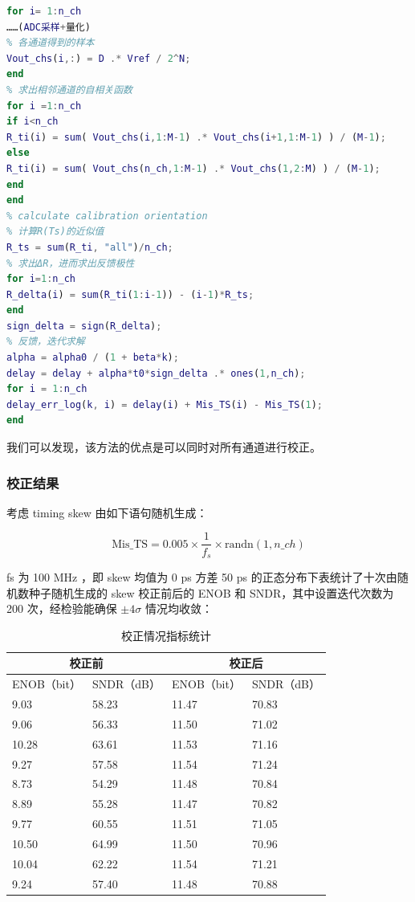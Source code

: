 \documentclass[cs4size,a4paper]{ctexart}
\numberwithin{equation}{section}
\numberwithin{table}{section}
\numberwithin{figure}{section}
\begin{document}
		\begin{flushleft}
			\begin{lstlisting}[language=Matlab]
for i= 1:n_ch
……(ADC采样+量化)
% 各通道得到的样本
Vout_chs(i,:) = D .* Vref / 2^N;
end
% 求出相邻通道的自相关函数
for i =1:n_ch
if i<n_ch
R_ti(i) = sum( Vout_chs(i,1:M-1) .* Vout_chs(i+1,1:M-1) ) / (M-1);
else
R_ti(i) = sum( Vout_chs(n_ch,1:M-1) .* Vout_chs(1,2:M) ) / (M-1);
end
end
% calculate calibration orientation 
% 计算R(Ts)的近似值
R_ts = sum(R_ti, "all")/n_ch;
% 求出ΔR，进而求出反馈极性
for i=1:n_ch
R_delta(i) = sum(R_ti(1:i-1)) - (i-1)*R_ts;
end
sign_delta = sign(R_delta);
% 反馈，迭代求解
alpha = alpha0 / (1 + beta*k);
delay = delay + alpha*t0*sign_delta .* ones(1,n_ch);
for i = 1:n_ch
delay_err_log(k, i) = delay(i) + Mis_TS(i) - Mis_TS(1);
end
			\end{lstlisting}
		\end{flushleft}
		
	我们可以发现，该方法的优点是可以同时对所有通道进行校正。
		
		
		\subsubsection{校正结果}
		
		考虑 timing skew 由如下语句随机生成：
		
		\[
		\text{Mis\_TS} = 0.005 \times \frac{1}{f_s} \times \text{randn}(1, n\_ch)
		\]

		
		fs 为 100 MHz ，即 skew 均值为 0 ps 方差 50 ps 的正态分布下表统计了十次由随机数种子随机生成的 skew 校正前后的 ENOB 和 SNDR，其中设置迭代次数为 200 次，经检验能确保 $\pm 4 \sigma$ 情况均收敛：
		
		
		
		
		\begin{table}[H]
			\centering
			\caption{校正情况指标统计}
			\begin{tabular}{|l|l|l|l|}
				\hline \multicolumn{2}{|c|}{校正前} & \multicolumn{2}{|c|}{校正后} \\
				\hline ENOB（bit） & SNDR（dB） & ENOB（bit） & SNDR（dB） \\
				\hline 9.03 & 58.23 & 11.47 & 70.83 \\
				\hline 9.06 & 56.33 & 11.50 & 71.02 \\
				\hline 10.28 & 63.61 & 11.53 & 71.16 \\
				\hline 9.27 & 57.58 & 11.54 & 71.24 \\
				\hline 8.73 & 54.29 & 11.48 & 70.84 \\
				\hline 8.89 & 55.28 & 11.47 & 70.82 \\
				\hline 9.77 & 60.55 & 11.51 & 71.05 \\
				\hline 10.50 & 64.99 & 11.50 & 70.96 \\
				\hline 10.04 & 62.22 & 11.54 & 71.21 \\
				\hline 9.24 & 57.40 & 11.48 & 70.88 \\
				\hline
			\end{tabular}
		\end{table}
		
\end{document}
